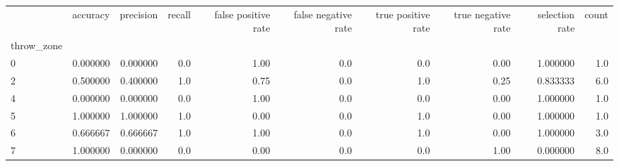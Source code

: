 \begin{tabular}{lrrrrrrrrr}
\toprule
{} &  accuracy &  precision &  recall &  false positive rate &  false negative rate &  true positive rate &  true negative rate &  selection rate &  count \\
throw\_zone &           &            &         &                      &                      &                     &                     &                 &        \\
\midrule
0          &  0.000000 &   0.000000 &     0.0 &                 1.00 &                  0.0 &                 0.0 &                0.00 &        1.000000 &    1.0 \\
2          &  0.500000 &   0.400000 &     1.0 &                 0.75 &                  0.0 &                 1.0 &                0.25 &        0.833333 &    6.0 \\
4          &  0.000000 &   0.000000 &     0.0 &                 1.00 &                  0.0 &                 0.0 &                0.00 &        1.000000 &    1.0 \\
5          &  1.000000 &   1.000000 &     1.0 &                 0.00 &                  0.0 &                 1.0 &                0.00 &        1.000000 &    1.0 \\
6          &  0.666667 &   0.666667 &     1.0 &                 1.00 &                  0.0 &                 1.0 &                0.00 &        1.000000 &    3.0 \\
7          &  1.000000 &   0.000000 &     0.0 &                 0.00 &                  0.0 &                 0.0 &                1.00 &        0.000000 &    8.0 \\
\bottomrule
\end{tabular}
